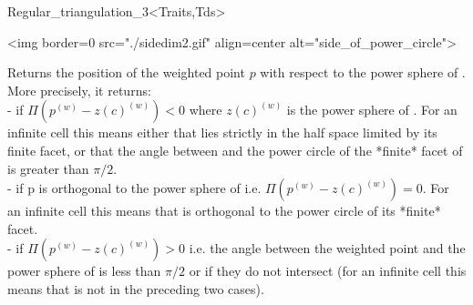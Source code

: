 \begin{ccClassTemplate}{Regular_triangulation_3<Traits,Tds>}
\begin{ccHtmlOnly}
<img border=0 src="./sidedim2.gif" align=center
alt="side\_of\_power\_circle"> 
\end{ccHtmlOnly}

{Returns the position of the weighted point $p$ with respect to the
power sphere of . More precisely, it returns:\\
-  if $\Pi({p}^{(w)}-{z(c)}^{(w)})<0$ where
${z(c)}^{(w)}$ is the power sphere of . For an
infinite cell this means either that  lies strictly in the half
space limited by its finite facet, or that the angle
between  and the power circle of the *finite* facet of 
is greater than $\pi/2$. \\  
-  if p is orthogonal to the power sphere of 
i.e. $\Pi({p}^{(w)}-{z(c)}^{(w)})=0$. For an infinite cell this means
that  is orthogonal to the power circle of its *finite* facet.\\ 
-  if $\Pi({p}^{(w)}-{z(c)}^{(w)})>0$
i.e. the angle between the weighted point  and the power sphere
of  is less than $\pi/2$ or if they do not intersect (for an
infinite cell this means that  is not in the preceding two cases).
}


\end{ccClassTemplate}

